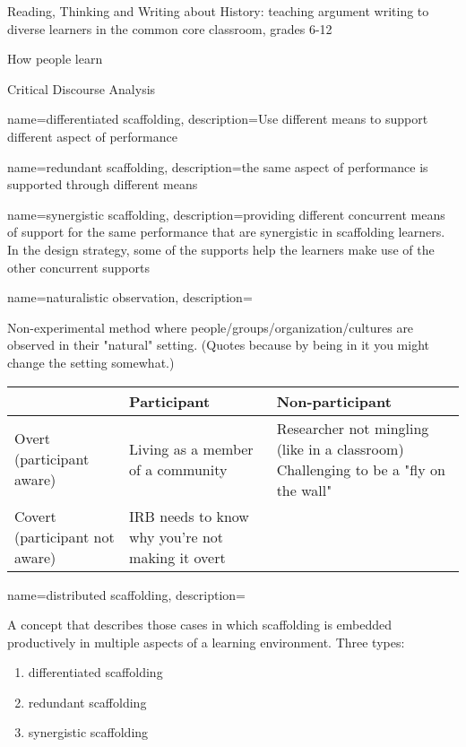 {Reading, Thinking and Writing about History: teaching argument writing to diverse learners in the common core classroom, grades 6-12}

{How people learn}

{Critical Discourse Analysis}

{
	name={differentiated scaffolding},
	description={Use different means to support different aspect of performance}
}

{
	name={redundant scaffolding},
	description={the same aspect of performance is supported through different means}
}

{
	name={synergistic scaffolding},
	description={providing different concurrent means of support for the same performance that are synergistic in scaffolding learners. In the design strategy, some of the supports help the learners make use of the other concurrent supports }
}
{
	name={naturalistic observation},
	description={
Non-experimental method where people/groups/organization/cultures are observed in their "natural" setting. (Quotes because by being in it you might change the setting somewhat.)


\begin{tabular}{p{1in}|p{2in}|p{2in}}
& Participant & Non-participant \\ \hline
Overt (participant aware) & 
Living as a member of a community & 
Researcher not mingling (like in a classroom) 
Challenging to be a "fly on the wall"
\\ \hline
Covert (participant not aware) & 
IRB needs to know why you're not making it overt & 
\end{tabular}
}
}

{
	name={distributed scaffolding},
	description={A concept that describes those cases in which scaffolding is embedded productively in multiple aspects of a learning environment.  \parencite{reiser_scaffolding_2014} Three types:
	\begin{enumerate}
	\item \gls{differentiated scaffolding} 
	\item \gls{redundant scaffolding} 
	\item \gls{synergistic scaffolding}
	\end{enumerate}
	}
}

